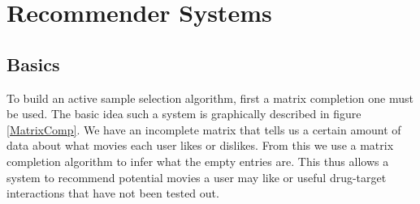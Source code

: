 \newcommand\setrow[9]{
  \setcounter{col}{1}
  \foreach \n in {#1, #2, #3, #4, #5, #6, #7, #8, #9} {
    \edef\x{\value{col} - 0.5}
    \edef\y{9.5 - \value{row}}
    \node[anchor=center] at (\x, \y) {\n};
    \stepcounter{col}
  }
  \stepcounter{row}
}
\chapter{Recommender Systems}
\ifpdf
    \graphicspath{{Chapter1/Chapter1Figs/PN1G/}{Chapter1/Chapter1Figs/PDF/}{Chapter1/Chapter1Figs/}}
\else
    \graphicspath{{Chapter1/Chapter1Figs/EPS/}{Chapter1/Chapter1Figs/}}
\fi
{}
\section{Basics}
To build an active sample selection algorithm, first a matrix completion one must be used. The basic idea such a system is graphically described in figure \ref{MatrixComp}. We have an incomplete matrix that tells us a certain amount of data about what movies each user likes or dislikes. From this we use a matrix completion algorithm to infer what the empty entries are. This thus allows a system to recommend potential movies a user may like or useful drug-target interactions that have not been tested out.
